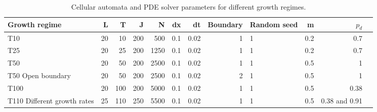 \begin{table}[H]
    \centering
    \begin{adjustbox}{center}

        \begin{tabular}{lrrrrrrrlrrl}
        \toprule
        \textbf{Growth regime} & \textbf{L} & \textbf{T} & \textbf{J} & \textbf{N} & \textbf{dx} & \textbf{dt} & \textbf{Boundary}  & \textbf{Random seed} & \textbf{m} & \textbf{$p_{d}$} \\
        \midrule
        T10 & 20 & 10 & 200 & 500 & 0.1 & 0.02 & 1  & 1 & 0.2 & 0.7 \\
        T25 & 20 & 25 & 200 & 1250 & 0.1 & 0.02 & 1  & 1 & 0.2 & 0.7 \\
        T50 & 20 & 50 & 200 & 2500 & 0.1 & 0.02 & 1  & 1 & 0.5 & 1 \\
        T50 Open boundary & 20 & 50 & 200 & 2500 & 0.1 & 0.02 & 2  & 1 & 0.5 & 1 \\
        T100 & 20 & 100 & 200 & 5000 & 0.1 & 0.02 & 1  & 1 & 0.5 & 0.38 \\
        T110 Different growth rates & 25 & 110 & 250 & 5500 & 0.1 & 0.02 & 1 & 1 & 0.5 & 0.38 and 0.91 \\
        \bottomrule
    \end{tabular}
        \end{adjustbox}

    \caption{Cellular automata and PDE solver parameters for different growth regimes.}
    \label{tab:numerical_param_table}
\end{table}


